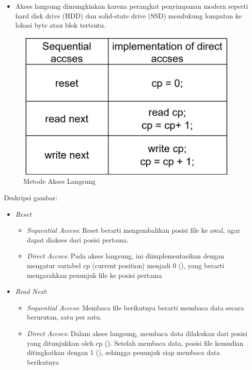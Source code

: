 \documentclass[12pt]{article}
\begin{document}
\begin{enumerate}
\begin{itemize}
        \item Akses langsung dimungkinkan karena perangkat penyimpanan modern seperti hard disk drive (HDD) dan solid-state drive (SSD) mendukung lompatan ke lokasi byte atau blok tertentu.
    \end{itemize}

    \begin{figure}[h]
        \centering
        \includegraphics[width=0.5\linewidth]{assets/p2.png}
        \caption{Metode Akses Langsung}
        \label{fig:sequential-access}
    \end{figure}

    {Deskripsi gambar:}
     \begin{itemize}
        \item \textit{Reset}
        \begin{itemize}
            \item \textit{Sequential Access}: Reset berarti mengembalikan posisi file ke awal, agar dapat diakses dari posisi pertama.
            
            \item \textit{Direct Accses}: Pada akses langsung, ini diimplementasikan dengan mengatur variabel cp (current position) menjadi 0 (), yang berarti mengarahkan penunjuk file ke posisi pertama
        
        \end{itemize}

        \item \textit{Read Next}:
        \begin{itemize}
        \item \textit{Sequential Access}: Membaca file berikutnya berarti membaca data secara berurutan, satu per satu.

        \item \textit{Direct Accses}: Dalam akses langsung, membaca data dilakukan dari posisi yang ditunjukkan oleh cp (). Setelah membaca data, posisi file kemudian ditingkatkan dengan 1 (), sehingga penunjuk siap membaca data berikutnya
        

\end{itemize}
\end{itemize}
\end{enumerate}
\end{document}
